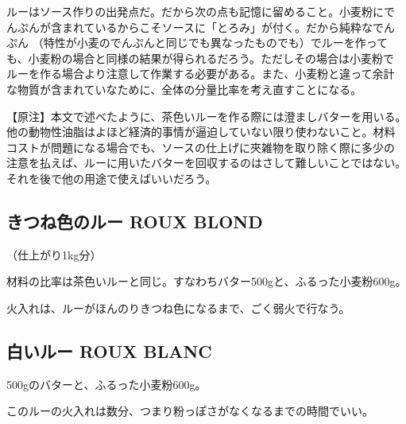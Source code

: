 \documentclass[twoside,12Q,b5paper,tombo]{escoffierltjsbook}
\newenvironment{recette}{\begin{multicols}{2}}{\end{multicols}}
\begin{document}
\begin{recette}
ルーはソース作りの出発点だ。だから次の点も記憶に留めること。小麦粉にで
んぷんが含まれているからこそソースに「とろみ」が付く。だから純粋なでん
ぷん （特性が小麦のでんぷんと同じでも異なったものでも）でルーを作って
も、小麦粉の場合と同様の結果が得られるだろう。ただしその場合は小麦粉で
ルーを作る場合より注意して作業する必要がある。また、小麦粉と違って余計
な物質が含まれていなために、全体の分量比率を考え直すことになる。

【原注】本文で述べたように、茶色いルーを作る際には澄ましバターを用いる。
他の動物性油脂はよほど経済的事情が逼迫していない限り使わないこと。材料
コストが問題になる場合でも、ソースの仕上げに夾雑物を取り除く際に多少の
注意を払えば、ルーに用いたバターを回収するのはさして難しいことではない。
それを後で他の用途で使えばいいだろう。

\subsection{きつね色のルー ROUX
BLOND}\label{ux304dux3064ux306dux8272ux306eux30ebux30fc-roux-blond}

（仕上がり1kg分）

材料の比率は茶色いルーと同じ。すなわちバター500gと、ふるった小麦粉600g。

火入れは、ルーがほんのりきつね色になるまで、ごく弱火で行なう。

\subsection{白いルー ROUX
BLANC}\label{ux767dux3044ux30ebux30fc-roux-blanc}

500gのバターと、ふるった小麦粉600g。

このルーの火入れは数分、つまり粉っぽさがなくなるまでの時間でいい。




\end{recette}%
\end{document}
